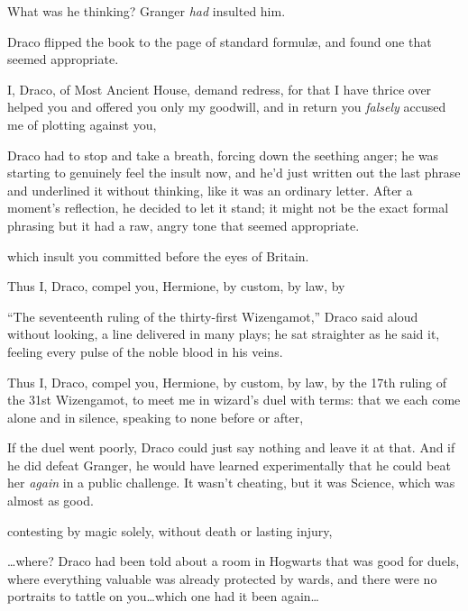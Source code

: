 What was he thinking? Granger \emph{had} insulted him.

Draco flipped the book to the page of standard formulæ, and found one that seemed appropriate.

\begin{writtenNote}
I, Draco, of Most Ancient House, demand redress, for that I have thrice over helped you and offered you only my goodwill, and in return you \emph{falsely} accused me of plotting against you,
\end{writtenNote}

Draco had to stop and take a breath, forcing down the seething anger; he was starting to genuinely feel the insult now, and he’d just written out the last phrase and underlined it without thinking, like it was an ordinary letter. After a moment’s reflection, he decided to let it stand; it might not be the exact formal phrasing but it had a raw, angry tone that seemed appropriate.

\begin{writtenNote}
which insult you committed before the eyes of Britain.

Thus I, Draco, compel you, Hermione, by custom, by law, by
\end{writtenNote}

“The seventeenth ruling of the thirty-first Wizengamot,” Draco said aloud without looking, a line delivered in many plays; he sat straighter as he said it, feeling every pulse of the noble blood in his veins.

\begin{writtenNote}
Thus I, Draco, compel you, Hermione, by custom, by law, by the 17th ruling of the 31st Wizengamot, to meet me in wizard’s duel with terms: that we each come alone and in silence, speaking to none before or after,
\end{writtenNote}

If the duel went poorly, Draco could just say nothing and leave it at that. And if he did defeat Granger, he would have learned experimentally that he could beat her \emph{again} in a public challenge. It wasn’t cheating, but it was Science, which was almost as good.

\begin{writtenNote}
contesting by magic solely, without death or lasting injury,
\end{writtenNote}

…where? Draco had been told about a room in Hogwarts that was good for duels, where everything valuable was already protected by wards, and there were no portraits to tattle on you…which one had it been again…

